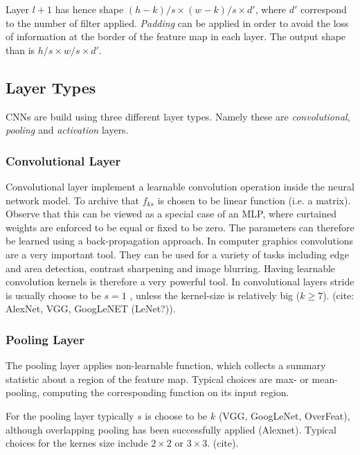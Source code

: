 Layer $l+1$ has hence shape $(h - k)/s \times (w-k)/s \times d'$, where $d'$ correspond to the number of filter applied. \emph{Padding} can be applied in order to avoid the loss of information at the border of the feature map in each layer. The output shape than is $h/s \times w/s \times d'$.

\subsection{Layer Types}

CNNs are build using three different layer types. Namely these are \emph{convolutional}, \emph{pooling} and \emph{activation} layers.

\subsubsection{Convolutional Layer}

Convolutional layer implement a learnable convolution operation inside the neural network model. To archive that $f_{ks}$ is chosen to be linear function (i.e. a matrix). Observe that this can be viewed as a special case of an MLP, where curtained weights are enforced to be equal or fixed to be zero. The parameters can therefore be learned using a back-propagation approach. In computer graphics convolutions are a very important tool. They can be used for a variety of tasks including edge and area detection, contrast sharpening and image blurring. Having learnable convolution kernels is therefore a very powerful tool. In convolutional layers stride is usually choose to be $s=1$ , unless the kernel-size is relatively big ($k \geq 7$).  (cite: AlexNet, VGG, GoogLeNET (LeNet?)).

 
 \subsubsection{Pooling Layer}

The pooling layer applies non-learnable function, which collects a summary statistic about a region of the feature map. Typical choices are max- or mean-pooling, computing the corresponding function on its input region. 

For the pooling layer typically $s$ is choose to be $k$ (VGG, GoogLeNet, OverFeat),  although overlapping pooling has been successfully applied (Alexnet). Typical choices for the kernes size include $2 \times 2$ or $3 \times 3$. (cite).

